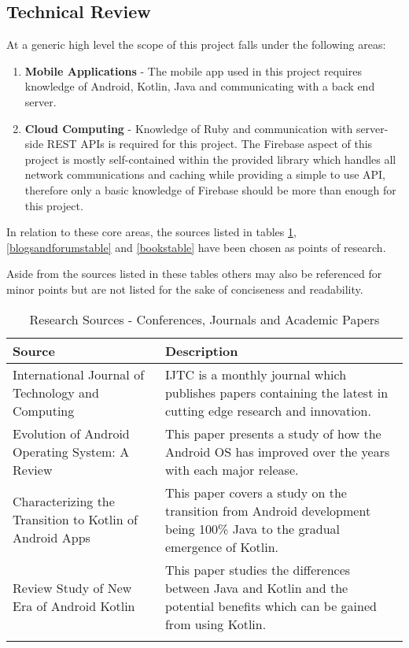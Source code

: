 \subsection{Technical Review}
\label{technicalreview}

At a generic high level the scope of this project falls under the following areas:

\begin{enumerate}
    \item \textbf{Mobile Applications} - The mobile app used in this project requires knowledge of Android, Kotlin, Java and communicating with a back end server.
    \item \textbf{Cloud Computing} - Knowledge of Ruby and communication with server-side REST APIs is required for this project. The Firebase aspect of this project is mostly self-contained within the provided library which handles all network communications and caching while providing a simple to use API, therefore only a basic knowledge of Firebase  should be more than enough for this project.
\end{enumerate}

In relation to these core areas, the sources listed in tables \ref{conferencesandjournalstable}, \ref{blogsandforumstable} and \ref{bookstable} have been chosen as points of research.

Aside from the sources listed in these tables others may also be referenced for minor points but are not listed for the sake of conciseness and readability.

\begin{longtable}{ |p{4cm}|p{10cm}|  }
		\hline
		\hline
		\textbf{Source} & \textbf{Description} \\
		\hline
		International Journal of Technology and Computing & IJTC\cite{ijtcref} is a monthly journal which publishes papers containing the latest in cutting edge research and innovation. \\
		\hline
		Evolution of Android Operating System: A Review & This paper presents a study of how the Android OS has improved over the years with each major release\cite{evolutionofandroidreview}. \\
		\hline
		Characterizing the Transition to Kotlin of Android Apps & This paper covers a study on the transition from Android development being 100\% Java to the gradual emergence of Kotlin\cite{androidkotlinstudy}.\\
		\hline
		Review Study of New Era of Android Kotlin & This paper studies the differences between Java and Kotlin and the potential benefits which can be gained from using Kotlin\cite{reviewonandroidkotlin}.\\
		\hline
    \caption{Research Sources - Conferences, Journals and Academic Papers}
	\label{conferencesandjournalstable}
\end{longtable}

